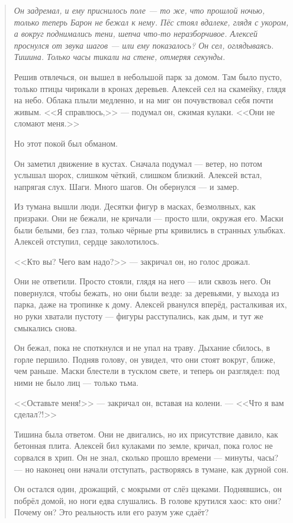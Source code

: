 \documentclass[12pt,a4paper]{book}
\newenvironment{dialogue}{\begin{quote}\itshape}{\end{quote}} %
\begin{document}
\begin{dialogue}
Он задремал, и ему приснилось поле --- то же, что прошлой ночью, только теперь Барон не бежал к нему. Пёс стоял вдалеке, глядя с укором, а вокруг поднимались тени, шепча что-то неразборчивое. Алексей проснулся от звука шагов --- или ему показалось? Он сел, оглядываясь. Тишина. Только часы тикали на стене, отмеряя секунды.

Решив отвлечься, он вышел в небольшой парк за домом. Там было пусто, только птицы чирикали в кронах деревьев. Алексей сел на скамейку, глядя на небо. Облака плыли медленно, и на миг он почувствовал себя почти живым. <<Я справлюсь,>> --- подумал он, сжимая кулаки. <<Они не сломают меня.>>

Но этот покой был обманом.

Он заметил движение в кустах. Сначала подумал --- ветер, но потом услышал шорох, слишком чёткий, слишком близкий. Алексей встал, напрягая слух. Шаги. Много шагов. Он обернулся --- и замер.

Из тумана вышли люди. Десятки фигур в масках, безмолвных, как призраки. Они не бежали, не кричали --- просто шли, окружая его. Маски были белыми, без глаз, только чёрные рты кривились в странных улыбках. Алексей отступил, сердце заколотилось.

<<Кто вы? Чего вам надо?>> --- закричал он, но голос дрожал.

Они не ответили. Просто стояли, глядя на него --- или сквозь него. Он повернулся, чтобы бежать, но они были везде: за деревьями, у выхода из парка, даже на тропинке к дому. Алексей рванулся вперёд, расталкивая их, но руки хватали пустоту --- фигуры расступались, как дым, и тут же смыкались снова.

Он бежал, пока не споткнулся и не упал на траву. Дыхание сбилось, в горле першило. Подняв голову, он увидел, что они стоят вокруг, ближе, чем раньше. Маски блестели в тусклом свете, и теперь он разглядел: под ними не было лиц --- только тьма.

<<Оставьте меня!>> --- закричал он, вставая на колени. --- <<Что я вам сделал?!>>

Тишина была ответом. Они не двигались, но их присутствие давило, как бетонная плита. Алексей бил кулаками по земле, кричал, пока голос не сорвался в хрип. Он не знал, сколько прошло времени --- минуты, часы? --- но наконец они начали отступать, растворяясь в тумане, как дурной сон.

Он остался один, дрожащий, с мокрыми от слёз щеками. Поднявшись, он побрёл домой, но ноги едва слушались. В голове крутился хаос: кто они? Почему он? Это реальность или его разум уже сдаёт?


\end{dialogue}
\end{document}
